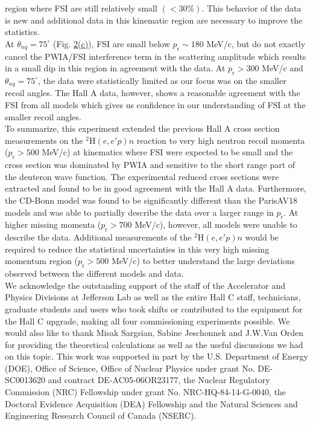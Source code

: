 region where FSI are still relatively small $(<30\%)$. This behavior of the data is new and additional data in this kinematic region are necessary
to improve the statistics. \\
\indent At $\theta_{nq}=75^{\circ}$ (Fig. \hyperref[fig:fig2]{2(c)}), FSI are small below $p_{\mathrm{r}}\sim180$ MeV/c, but do not exactly cancel the PWIA/FSI interference term in the scattering amplitude which results in a small dip in this region in agreement with the data.
At $p_{\mathrm{r}}>300$ MeV/c and $\theta_{nq}=75^{\circ}$, the data were statistically limited as our focus was on the smaller recoil angles. The Hall A data, however, shows a reasonable agreement with the FSI from all models which gives us confidence in our understanding
of FSI at the smaller recoil angles. \\
\indent To summarize, this experiment extended the previous Hall A cross section measurements on the $^{2}\mathrm{H}(e,e'p)n$ reaction to 
very high neutron recoil momenta ($p_{\mathrm{r}}>500$ MeV/c) at kinematics where FSI were expected to be small and the cross section was dominated by PWIA and sensitive to the
short range part of the deuteron wave function. The experimental reduced cross sections were extracted and found to be in good agreement with the Hall A data.
Furthermore, the CD-Bonn model was found to be significantly different than the Paris\DIFdelbegin {}\DIFdelend \DIFaddbegin \DIFadd{, }\DIFaddend AV18 \DIFaddbegin {}\DIFaddend models and was able to partially describe the data over a larger range in $p_{\mathrm{r}}$.
At higher missing momenta ($p_{\mathrm{r}}>700$ MeV/c), however, all models were unable to describe the data. 
Additional measurements of the $^{2}\mathrm{H}(e,e'p)n$ would be required to reduce the statistical uncertainties in this very high missing
momentum region ($p_{\mathrm{r}}>500$ MeV/c) to better understand the large deviations observed between the different models and data.\\
\indent We acknowledge the outstanding support of the staff of the Accelerator and Physics Divisions at Jefferson Lab
as well as the entire Hall C staff, technicians, graduate students and users who took shifts or contributed
to the equipment for the Hall C upgrade, making all four commissioning experiments possible. We would also like to
thank Misak Sargsian, Sabine Jeschonnek and J.W.Van Orden for providing the theoretical calculations as well as the useful
discussions we had on this topic. This work was supported in part by the U.S. Department of Energy (DOE), Office of Science, Office of Nuclear Physics
under grant No. DE-SC0013620 and contract DE-AC05-06OR23177, the Nuclear Regulatory Commission (NRC) Fellowship
under grant No. NRC-HQ-84-14-G-0040, the Doctoral Evidence Acquisition (DEA) Fellowship and the Natural Sciences and Engineering Research Council of Canada (NSERC).

